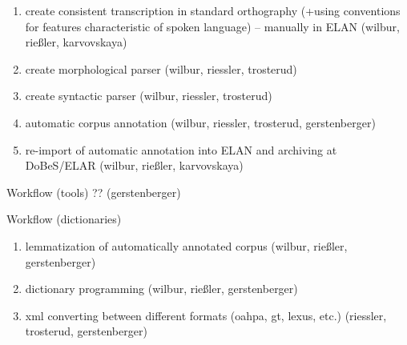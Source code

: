 \documentclass[a4paper,12pt]{article}
\begin{document}
\begin{enumerate}
\item create consistent transcription in standard orthography (+using conventions for features characteristic of spoken language) – manually in ELAN (wilbur, rießler, karvovskaya)
\item create morphological parser (wilbur, riessler, trosterud)
\item create syntactic parser (wilbur, riessler, trosterud)
\item automatic corpus annotation (wilbur, riessler, trosterud, gerstenberger)
\item re-import of automatic annotation into ELAN and archiving at DoBeS/ELAR (wilbur, rießler, karvovskaya)
\end{enumerate}


Workflow (tools)
?? (gerstenberger)

Workflow (dictionaries)

\begin{enumerate}
\item lemmatization of automatically annotated corpus (wilbur, rießler, gerstenberger)
\item dictionary programming (wilbur, rießler, gerstenberger)
\item xml converting between different formats (oahpa, gt, lexus, etc.) (riessler, trosterud, gerstenberger)
\end{enumerate}

\end{document}
